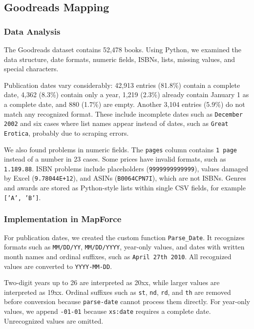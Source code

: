 \documentclass[runningheads]{llncs}
\begin{document}
\subsection{Goodreads Mapping}

\subsubsection{Data Analysis}

The Goodreads dataset contains 52,478 books. Using Python,
we examined the data structure, date formats, numeric fields,
ISBNs, lists, missing values, and special characters.

Publication dates vary considerably: 42,913 entries (81.8\%)
contain a complete date, 4,362 (8.3\%) contain only a year,
1,219 (2.3\%) already contain January 1 as a complete date,
and 880 (1.7\%) are empty. Another 3,104 entries (5.9\%)
do not match any recognized format. These include incomplete
dates such as \texttt{December 2002} and six cases where
list names appear instead of dates, such as
\texttt{Great Erotica}, probably due to scraping errors.

We also found problems in numeric fields. The \texttt{pages}
column contains \texttt{1 page} instead of a number in
23 cases. Some prices have invalid formats, such as
\texttt{1.189.88}. ISBN problems include placeholders
(\texttt{9999999999999}), values damaged by Excel
(\texttt{9.78044E+12}), and ASINs
(\texttt{B0064CPN7I}), which are not ISBNs.
Genres and awards are stored as Python-style lists within
single CSV fields, for example \texttt{['A', 'B']}.

\subsubsection{Implementation in MapForce}

For publication dates, we created the custom function
\texttt{Parse\_Date}. It recognizes formats such as
\texttt{MM/DD/YY}, \texttt{MM/DD/YYYY}, year-only values,
and dates with written month names and ordinal suffixes,
such as \texttt{April 27th 2010}. All recognized values
are converted to \texttt{YYYY-MM-DD}.

Two-digit years up to 26 are interpreted as 20xx, while
larger values are interpreted as 19xx. Ordinal suffixes
such as \texttt{st}, \texttt{nd}, \texttt{rd}, and
\texttt{th} are removed before conversion because
\texttt{parse-date} cannot process them directly.
For year-only values, we append \texttt{-01-01} because
\texttt{xs:date} requires a complete date. Unrecognized
values are omitted.
\end{document}
